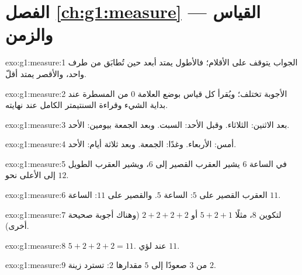 \section*{الفصل \ref{ch:g1:measure} --- القياس والزمن}

\begin{solution}{exo:g1:measure:1}
الجواب يتوقف على الأقلام؛ فالأطول يمتد أبعد حين تُطابَق من طرف
واحد، والأقصر يمتد أقلّ.
\end{solution}

\begin{solution}{exo:g1:measure:2}
الأجوبة تختلف؛ ويُقرأ كل قياس بوضع العلامة $0$ من المسطرة عند
بداية الشيء وقراءة السنتيمتر الكامل عند نهايته.
\end{solution}

\begin{solution}{exo:g1:measure:3}
بعد الاثنين: الثلاثاء. وقبل الأحد: السبت. وبعد الجمعة
بيومين: الأحد.
\end{solution}

\begin{solution}{exo:g1:measure:4}
أمس: الأربعاء. وغدًا: الجمعة. وبعد ثلاثة أيام: الأحد.
\end{solution}

\begin{solution}{exo:g1:measure:5}
في الساعة $6$ يشير العقرب القصير إلى $6$، ويشير العقرب الطويل
إلى الأعلى نحو $12$.
\end{solution}

\begin{solution}{exo:g1:measure:6}
العقرب القصير على $5$: الساعة $5$. والقصير على $11$: الساعة $11$.
\end{solution}

\begin{solution}{exo:g1:measure:7}
لتكوين $8$، مثلًا $5 + 2 + 1$ أو $2 + 2 + 2 + 2$ (وهناك أجوبة
صحيحة أخرى).
\end{solution}

\begin{solution}{exo:g1:measure:8}
$5 + 2 + 2 + 2 = 11$. عند لؤي $11$.
\end{solution}

\begin{solution}{exo:g1:measure:9}
من $3$ صعودًا إلى $5$ مقدارها $2$: تسترد زينة $2$.
\end{solution}
